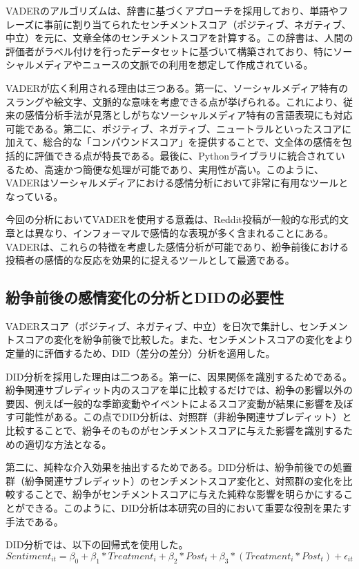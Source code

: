 \documentclass[11pt, a4j]{jreport}
\begin{document}
    VADERのアルゴリズムは、辞書に基づくアプローチを採用しており、単語やフレーズに事前に割り当てられたセンチメントスコア（ポジティブ、ネガティブ、中立）を元に、文章全体のセンチメントスコアを計算する。この辞書は、人間の評価者がラベル付けを行ったデータセットに基づいて構築されており、特にソーシャルメディアやニュースの文脈での利用を想定して作成されている。

    VADERが広く利用される理由は三つある。第一に、ソーシャルメディア特有のスラングや絵文字、文脈的な意味を考慮できる点が挙げられる。これにより、従来の感情分析手法が見落としがちなソーシャルメディア特有の言語表現にも対応可能である。第二に、ポジティブ、ネガティブ、ニュートラルといったスコアに加えて、総合的な「コンパウンドスコア」を提供することで、文全体の感情を包括的に評価できる点が特長である。最後に、Pythonライブラリに統合されているため、高速かつ簡便な処理が可能であり、実用性が高い。このように、VADERはソーシャルメディアにおける感情分析において非常に有用なツールとなっている。

    今回の分析においてVADERを使用する意義は、Reddit投稿が一般的な形式的文章とは異なり、インフォーマルで感情的な表現が多く含まれることにある。VADERは、これらの特徴を考慮した感情分析が可能であり、紛争前後における投稿者の感情的な反応を効果的に捉えるツールとして最適である。

    \subsection{紛争前後の感情変化の分析とDIDの必要性}
    VADERスコア（ポジティブ、ネガティブ、中立）を日次で集計し、センチメントスコアの変化を紛争前後で比較した。また、センチメントスコアの変化をより定量的に評価するため、DID（差分の差分）分析を適用した。

    DID分析を採用した理由は二つある。第一に、因果関係を識別するためである。紛争関連サブレディット内のスコアを単に比較するだけでは、紛争の影響以外の要因、例えば一般的な季節変動やイベントによるスコア変動が結果に影響を及ぼす可能性がある。この点でDID分析は、対照群（非紛争関連サブレディット）と比較することで、紛争そのものがセンチメントスコアに与えた影響を識別するための適切な方法となる。
    
    第二に、純粋な介入効果を抽出するためである。DID分析は、紛争前後での処置群（紛争関連サブレディット）のセンチメントスコア変化と、対照群の変化を比較することで、紛争がセンチメントスコアに与えた純粋な影響を明らかにすることができる。このように、DID分析は本研究の目的において重要な役割を果たす手法である。

    DID分析では、以下の回帰式を使用した。
    \begin{equation}
        Sentiment_{it} = \beta_{0} + \beta_{1}*Treatment_{i} + \beta_{2}*Post_{t} + \beta_{3}*(Treatment_{i} * Post_{t}) + \epsilon_{it}
    \end{equation}
\end{document}
